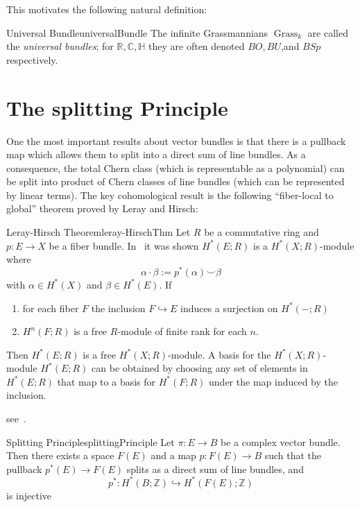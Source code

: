 \documentclass{book}
\newenvironment{Proof}[1][]
  {\begin{ProofTcb}[#1]}
  {\end{ProofTcb}}
\newcommand{\R}{{\mathbb{R}}}
\newcommand{\Z}{{\mathbb{Z}}}
\newcommand{\C}{{\mathbb{C}}}
\renewcommand{\H}{{\mathbb{H}}}
\newcommand{\Grass}{{\operatorname{Grass}}}
\begin{document}
\begin{Proof}
  \cite[section~1.2]{NateKTheory}
\end{Proof}

This motivates the following natural definition:

\begin{defn}{Universal Bundle}{universalBundle}
  The infinite Grassmannians $\Grass_{k}$ are called the \emph{universal bundles}; for $\R, \C, \H$ they are often
	denoted $BO, BU$,and $BSp$ respectively.
\end{defn}

\section{The splitting Principle}

One the most important results about vector bundles is that there is a pullback map which allows them to split
into a direct sum of line bundles. As a consequence, the total Chern class (which is representable as
a polynomial) can be split into product of Chern classes of line bundles (which can be represented by linear
terms). The key cohomological result is the following ``fiber-local to global'' theorem proved by Leray and
Hirsch:

\begin{thm}{Leray-Hirsch Theorem}{leray-HirschThm}
	Let $R$ be a commutative ring and $p: E \to X$ be a fiber bundle. In~\cite{NateAlgTop} it was shown $H^*(E;R)$
	is a $H^*(X;R)$-module where
	\[
		\alpha\cdot \beta := p^*(\alpha)\smile \beta
	\]
	with $\alpha \in H^*(X)$ and $\beta \in H^*(E)$. If
	\begin{enumerate}
		\item for each fiber $F$ the inclusion $F \hookrightarrow E$ induces a surjection on $H^*(-;R)$
		\item $H^n(F;R)$ is a free $R$-module of finite rank for each $n$.
	\end{enumerate}
	Then $H^*(E;R)$ is a free $H^*(X;R)$-module. A basis for the $H^*(X;R)$-module $H^*(E;R)$ can be obtained
	by choosing any set of elements in $H^*(E;R)$ that map to a basis for $H^*(F;R)$ under the map induced by
	the inclusion.
\end{thm}

\begin{Proof}
	see~\cite{NateAlgTop}.
\end{Proof}


\begin{thm}{Splitting Principle}{splittingPrinciple}
	Let $\pi: E \to B$ be a complex vector bundle. Then there exists a space $F(E)$ and a map $p: F(E) \to B$ such
	that the pullback $p^*(E) \to F(E)$ splits as a direct sum of line bundles, and
	\[
		p^*: H^*(B; \Z) \hookrightarrow H^*(F(E); \Z)
	\]
	is injective
\end{thm}
\end{document}
